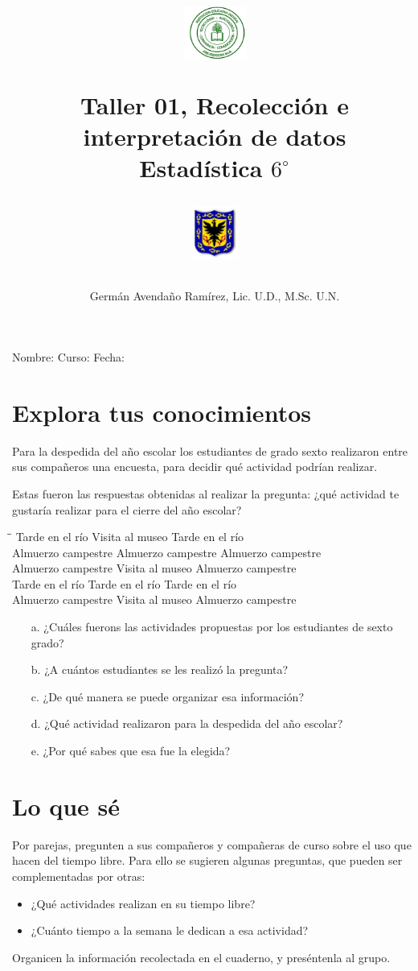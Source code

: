 \documentclass[10pt,twoside]{article}
\author{Germ\'an Avenda\~no Ram\'irez, Lic. U.D., M.Sc. U.N.}
\title{\begin{minipage}{.2\textwidth}
\includegraphics[height=1.75cm]{Images/logo-colegio.png}\end{minipage}
\begin{minipage}{.55\textwidth}
\begin{center}
Taller 01, Recolección e interpretación de datos\\
Estadística $6^{\circ}$
\end{center}
\end{minipage}\hfill
\begin{minipage}{.2\textwidth}
\includegraphics[height=1.75cm]{Images/logo-sed.png} 
\end{minipage}}
\date{}
\begin{document}
\maketitle
Nombre: \hrulefill Curso: \underline{\hspace*{44pt}} Fecha: \underline{\hspace*{2.5cm}}
\section*{Explora tus conocimientos}
Para la despedida del año escolar los estudiantes de grado sexto realizaron entre sus compañeros una encuesta, para decidir qué actividad podrían realizar.

Estas fueron las respuestas obtenidas al realizar la pregunta: ¿qué actividad te gustaría realizar para el cierre del año escolar?
 \begin{tabbing}
 \hspace{4.5cm}\=\hspace{4.5cm}\=\kill
 Tarde en el río \> Visita al museo \> Tarde en el río \\ 
 Almuerzo campestre \> Almuerzo campestre \> Almuerzo campestre\\ 
 Almuerzo campestre \> Visita al museo \> Almuerzo campestre\\ 
 Tarde en el río \> Tarde en el río \> Tarde en el río\\ 
 Almuerzo campestre \> Visita al museo \> Almuerzo campestre
                   \end{tabbing}
\begin{enumerate}
 \item[a.]  ¿Cuáles fuerons las actividades propuestas por los estudiantes de sexto grado?
 \item[b.] ¿A cuántos estudiantes se les realizó la pregunta?
 \item[c.] ¿De qué manera se puede organizar esa información?
 \item[d.] ¿Qué actividad realizaron para la despedida del año escolar?
 \item[e.] ¿Por qué sabes que esa fue la elegida?
\end{enumerate}
\section*{Lo que sé}
Por parejas, pregunten a sus compañeros y compañeras de curso sobre el uso que hacen del tiempo libre. Para ello se sugieren algunas preguntas, que pueden ser complementadas por otras:
\begin{itemize}
 \item  ¿Qué actividades realizan en su tiempo libre?
 \item ¿Cuánto tiempo a la semana le dedican a esa actividad?
\end{itemize}
Organicen la información recolectada en el cuaderno, y preséntenla al grupo.
\end{document}
